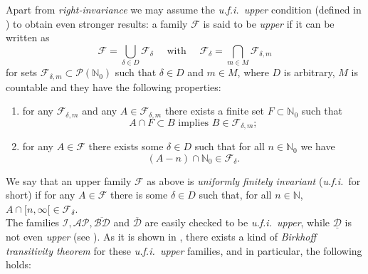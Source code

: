 \documentclass[openright,11pt]{article}
\theoremstyle{plain}
\theoremstyle{definition}
\newcommand{\NN}{\mathbb{N}}
\newcommand{\AP}{\mathcal{AP}}
\newcommand{\Fc}{\mathcal{F}}
\newcommand{\Ic}{\mathcal{I}}
\newcommand{\Part}{\mathscr{P}}
\newcommand{\BDsup}{\overline{\mathcal{BD}}}
\newcommand{\Dsup}{\overline{\mathcal{D}}}
\newcommand{\Dinf}{\underline{\mathcal{D}}}
\begin{document}
Apart from {\em right-invariance} we may assume the {\em u.f.i.\ upper} condition (defined in \cite{BG2018}) to obtain even stronger results: a family $\Fc$ is said to be {\em upper} if it can be written as
\[
\Fc = \bigcup_{\delta \in D} \Fc_{\delta} \quad \text{ with } \quad \Fc_{\delta} = \bigcap_{m \in M} \Fc_{\delta,m}
\]
for sets $\Fc_{\delta,m} \subset \Part(\NN_0)$ such that $\delta\in D$ and $m \in M$, where $D$ is arbitrary, $M$ is countable and they have the following properties:
\begin{enumerate}
	\item[(i)] for any $\Fc_{\delta,m}$ and any $A \in \Fc_{\delta,m}$ there exists a finite set $F \subset \NN_0$ such that
	\[
	A\cap F \subset B \text{ implies } B \in \Fc_{\delta,m}; 
	\]
	
	\item[(ii)] for any $A \in \Fc$ there exists some $\delta \in D$ such that for all $n \in \NN_0$ we have
	\[
	(A-n)\cap\NN_0 \in \Fc_{\delta}.
	\]
\end{enumerate}
We say that an upper family $\Fc$ as above is {\em uniformly finitely invariant} ({\em u.f.i.}\ for short) if for any $A \in \Fc$ there is some $\delta \in D$ such that, for all $n\in\NN$, $A \cap [n,\infty[ \in \Fc_{\delta}$.\\[-5pt]

The families $\Ic,\AP,\BDsup$ and $\Dsup$ are easily checked to be {\em u.f.i.\ upper}, while $\Dinf$ is not even {\em upper} (see \cite{BG2018,CarMur2022_MS}). As it is shown in \cite{BG2018}, there exists a kind of {\em Birkhoff transitivity theorem} for these {\em u.f.i.\ upper} families, and in particular, the following holds:
\end{document}
